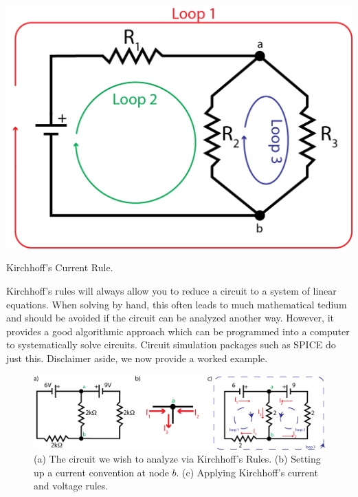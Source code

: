 \documentclass{tufte-book}
\begin{document}
\begin{marginfigure}%
  \includegraphics[width=\linewidth]{Kirchoff_II}
  \caption{Kirchhoff's Current Rule.}
  \label{fig:kirchhoff_deriv3}
\end{marginfigure}


\noindent Kirchhoff's rules will always allow you to reduce a circuit to a system of linear equations. When solving by hand, this often leads to much mathematical tedium and should be avoided if the circuit can be analyzed another way. However, it provides a good algorithmic approach which can be programmed into a computer to systematically solve circuits. Circuit simulation packages such as SPICE do just this. Disclaimer aside, we now provide a worked example. 
\\
\begin{figure}[h]
\caption{(a) The circuit we wish to analyze via Kirchhoff's Rules. (b) Setting up a current convention at node $b$. (c) Applying Kirchhoff's current and voltage rules.}
\label{fig:kirchhoff_ex}
\begin{center}
\includegraphics[width=\textwidth]{kirchoff_ex.png}
\end{center}
\end{figure}
\end{document}
